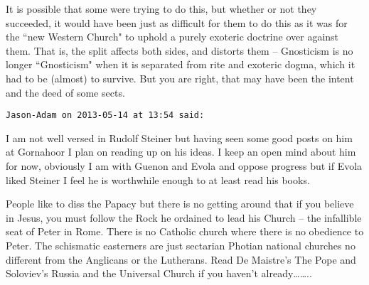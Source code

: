 \begin{footnotesize}
\begin{sffamily}
It is possible that some were trying to do this, but whether or not they succeeded, it would have been just as difficult for them to do this as it was for the ``new Western Church" to uphold a purely exoteric doctrine over against them. That is, the split affects both sides, and distorts them – Gnosticism is no longer ``Gnosticism" when it is separated from rite and exoteric dogma, which it had to be (almost) to survive. But you are right, that may have been the intent and the deed of some sects.


\hfill

\texttt{Jason-Adam on 2013-05-14 at 13:54 said: }

I am not well versed in Rudolf Steiner but having seen some good posts on him at Gornahoor I plan on reading up on his ideas. I keep an open mind about him for now, obviously I am with Guenon and Evola and oppose progress but if Evola liked Steiner I feel he is worthwhile enough to at least read his books. 

People like to diss the Papacy but there is no getting around that if you believe in Jesus, you must follow the Rock he ordained to lead his Church – the infallible seat of Peter in Rome. There is no Catholic church where there is no obedience to Peter. The schismatic easterners are just sectarian Photian national churches no different from the Anglicans or the Lutherans. Read De Maistre's The Pope and Soloviev's Russia and the Universal Church if you haven't already……..


\end{sffamily}\end{footnotesize}
